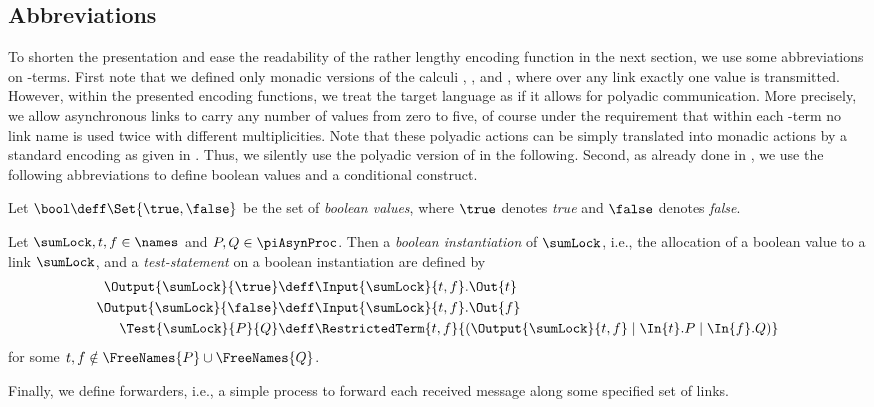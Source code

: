 \documentclass[]{llncs}
\begin{document}
\subsection{Abbreviations}
\label{sec:abbreviations}

To shorten the presentation and ease the readability of the rather lengthy encoding function in the next section, we use some abbreviations on \piAsyn-terms. 
First note that we defined only monadic versions of the calculi \piMix, \piSep, and \piAsyn, where over any link exactly one value is transmitted. However, within the presented encoding functions, we treat the target language \piAsyn as if it allows for polyadic communication. More precisely, we allow asynchronous links to carry any number of values from zero to five, of course under the requirement that within each \piAsyn-term no link name is used twice with different multiplicities. Note that these polyadic actions can be simply translated into monadic actions by a standard encoding as given in \cite{sangiorgiWalker01}. Thus, we silently use the polyadic version of \piAsyn in the following.
Second, as already done in \cite{nestmann00}, we use the following abbreviations to define boolean values and a conditional construct.

\begin{definition}
\label{def:testBoolean}
	Let $ \bool \deff \Set{ \true, \false } $ be the set of \emph{boolean values}, where $ \true $ denotes \emph{true} and $ \false $ denotes \emph{false}.
	
	Let $ \sumLock, t, f \in \names $ and $ P, Q \in \piAsynProc $. Then a \emph{boolean instantiation} of $ \sumLock $, i.e., the allocation of a boolean value to a link $ \sumLock $, and a \emph{test-statement} on a boolean instantiation are defined by
	\begin{align*}
		\Output{\sumLock}{\true} & \deff \Input{\sumLock}{t, f}.\Out{t}\\
		\Output{\sumLock}{\false} & \deff \Input{\sumLock}{t, f}.\Out{f}\\
		\Test{\sumLock}{P}{Q} & \deff \RestrictedTerm{t, f}{\left( \Output{\sumLock}{t, f} \mid \In{t}.P \mid \In{f}.Q \right)}
	\end{align*}
	for some $ t, f \notin \FreeNames{P} \cup \FreeNames{Q} $.
\end{definition}

Finally, we define forwarders, i.e., a simple process to forward each received message along some specified set of links.
\end{document}
